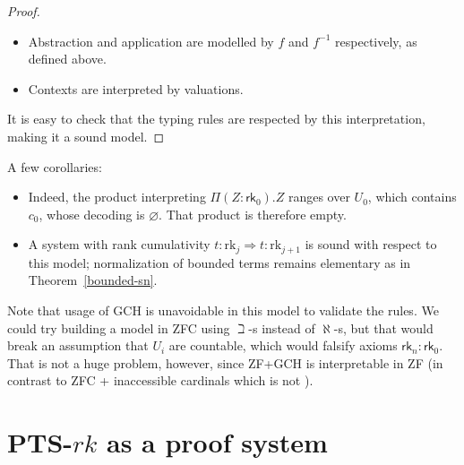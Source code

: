 \documentclass{article}
\theoremstyle{definition}
\theoremstyle{remark}
\begin{document}
\begin{proof}
\begin{itemize}
            Thus, for all such $a,b$ we can choose a
            cardinal $\kappa_{\Pi(x:a).b(x)}$ (whose
            code lies in $U_{\max(m+1,n)}$) along with
            a bijection
            \[
                f:\left(\prod_{
                    x\in\operatorname{El}(a)}
                \operatorname{El}(b(x))
                \right)\simeq\kappa_{\Pi(x:a).b(x)}
            \]
            The eligible pairs $(\kappa, f)$ form a
            set, so ordinary choice (which holds in
            ZF+GCH \cite{sierpinski1947hypothese,
            specker1954verallgemeinerte}) suffices.
            Make each choice
            once for each $(a,b)$, independently of a
            typing derivation or rank bound.
        \item Abstraction and application are modelled
            by $f$ and $f^{-1}$ respectively, as
            defined above.
        \item Contexts are interpreted by valuations.
    \end{itemize}
    It is easy to check that the typing rules are
    respected by this interpretation, making it a sound
    model.
\end{proof}

A few corollaries:

\begin{itemize}
    \item Indeed, the product interpreting
        \(\Pi(Z:\mathsf{rk}_0).Z\) ranges over \(U_0\),
        which contains \(c_0\), whose decoding is
        $\varnothing$. That product is therefore empty.
    \item A system with rank cumulativity
        $t:\mathrm{rk}_j\Rightarrow
        t:\mathrm{rk}_{j+1}$ is sound with respect to
        this model; normalization of bounded terms
        remains elementary as in
        Theorem~\ref{bounded-sn}.
\end{itemize}

Note that usage of GCH is unavoidable in this model to
validate the rules. We could try building a model in
ZFC using $\beth$-s instead of $\aleph$-s, but that
would break an assumption that $U_i$ are countable,
which would falsify axioms
$\mathsf{rk}_n:\mathsf{rk}_0$. That is not a huge
problem, however, since ZF+GCH is interpretable in ZF
\cite{godel1938consistency,godel1940consistency} (in
contrast to ZFC + inaccessible cardinals which is not
\cite{kanamori2003higher,kunen1980set,godel1931formal}
).

\section{PTS-\texorpdfstring{$rk$}{rk} as a proof
system}
\label{proof-system}
\end{document}
